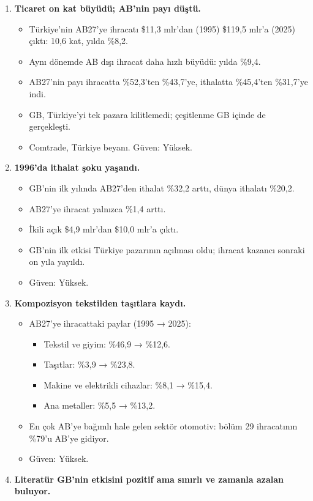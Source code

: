 \begin{enumerate}
\def\labelenumi{\arabic{enumi}.}
\tightlist
\item
  \textbf{Ticaret on kat büyüdü; AB'nin payı düştü.}

  \begin{itemize}
  \tightlist
  \item
    Türkiye'nin AB27'ye ihracatı \$11,3 mlr'dan (1995) \$119,5 mlr'a (2025) çıktı: 10,6 kat, yılda \%8,2.
  \item
    Aynı dönemde AB dışı ihracat daha hızlı büyüdü: yılda \%9,4.
  \item
    AB27'nin payı ihracatta \%52,3'ten \%43,7'ye, ithalatta \%45,4'ten \%31,7'ye indi.
  \item
    GB, Türkiye'yi tek pazara kilitlemedi; çeşitlenme GB içinde de gerçekleşti.
  \item
    \etiketV{} Comtrade, Türkiye beyanı. Güven: Yüksek.
  \end{itemize}
\item
  \textbf{1996'da ithalat şoku yaşandı.}

  \begin{itemize}
  \tightlist
  \item
    GB'nin ilk yılında AB27'den ithalat \%32,2 arttı, dünya ithalatı \%20,2.
  \item
    AB27'ye ihracat yalnızca \%1,4 arttı.
  \item
    İkili açık \$4,9 mlr'dan \$10,0 mlr'a çıktı.
  \item
    GB'nin ilk etkisi Türkiye pazarının açılması oldu; ihracat kazancı sonraki on yıla yayıldı.
  \item
    \etiketV{} Güven: Yüksek.
  \end{itemize}
\item
  \textbf{Kompozisyon tekstilden taşıtlara kaydı.}

  \begin{itemize}
  \tightlist
  \item
    AB27'ye ihracattaki paylar (1995 → 2025):

    \begin{itemize}
    \tightlist
    \item
      Tekstil ve giyim: \%46,9 → \%12,6.
    \item
      Taşıtlar: \%3,9 → \%23,8.
    \item
      Makine ve elektrikli cihazlar: \%8,1 → \%15,4.
    \item
      Ana metaller: \%5,5 → \%13,2.
    \end{itemize}
  \item
    En çok AB'ye bağımlı hale gelen sektör otomotiv: bölüm 29 ihracatının \%79'u AB'ye gidiyor.
  \item
    \etiketV{} Güven: Yüksek.
  \end{itemize}
\item
  \textbf{Literatür GB'nin etkisini pozitif ama sınırlı ve zamanla azalan buluyor.}


\end{enumerate}
